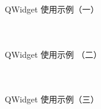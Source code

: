 \documentclass[UTF8,aspectratio=169]{beamer}
\begin{document}
\begin{frame}[fragile]{QWidget 使用示例（一）  }
    \begin{columns}
        \begin{column}{0.48\textwidth}
            \inputminted[firstline=1,lastline=16]{cpp}{code/qt_widget_example.cpp}
        \end{column}
        \begin{column}{0.48\textwidth}
            \inputminted[firstline=17,lastline=31]{cpp}{code/qt_widget_example.cpp}
        \end{column}
    \end{columns}
\end{frame}

\begin{frame}[fragile]{QWidget 使用示例 （二）  }
    \begin{columns}
        \begin{column}{0.48\textwidth}
            \inputminted[firstline=33,lastline=51]{cpp}{code/qt_widget_example.cpp}
        \end{column}
        \begin{column}{0.48\textwidth}
            \inputminted[firstline=52,lastline=68]{cpp}{code/qt_widget_example.cpp}
        \end{column}
    \end{columns}
\end{frame}

\begin{frame}[fragile]{QWidget 使用示例（三）  }
    \begin{columns}
        \begin{column}{0.48\textwidth}
            \inputminted[firstline=69,lastline=83]{cpp}{code/qt_widget_example.cpp}
        \end{column}
        \begin{column}{0.48\textwidth}
            \inputminted[firstline=84,lastline=98]{cpp}{code/qt_widget_example.cpp}
        \end{column}
    \end{columns}
\end{frame}
\end{document}
